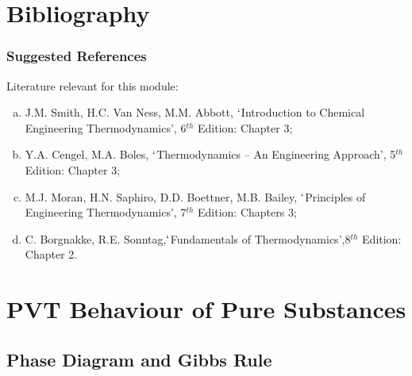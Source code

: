\documentclass[10pt,compress]{beamer}
\begin{document}
\section{Bibliography}
\begin{frame}
 \frametitle{Suggested References}
  Literature relevant for this module:
  \begin{enumerate}[(a)]
   \item J.M. Smith, H.C. Van Ness, M.M. Abbott, $\lq$Introduction to Chemical Engineering Thermodynamics', 6$^{th}$ Edition: Chapter 3;
   \item Y.A. Cengel, M.A. Boles, $\lq$Thermodynamics -- An Engineering Approach', 5$^{th}$ Edition: Chapter 3; 
   \item M.J. Moran, H.N. Saphiro, D.D. Boettner, M.B. Bailey, $\lq$Principles of Engineering Thermodynamics', 7$^{th}$ Edition: Chapters 3;
   \item C. Borgnakke, R.E. Sonntag,$\lq$Fundamentals of Thermodynamics',8$^{th}$ Edition: Chapter 2.
  \end{enumerate}
\end{frame}



\section{PVT Behaviour of Pure Substances}

\subsection{Phase Diagram and Gibbs Rule} 
\end{document}
